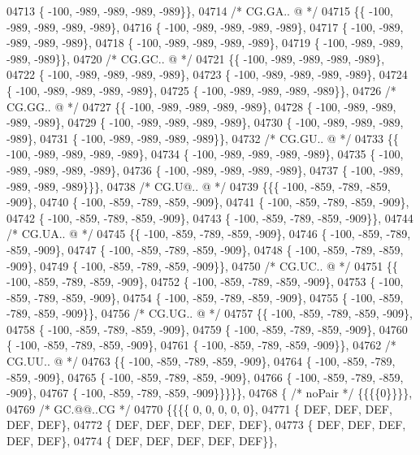 \begin{DoxyCode}
04713 \{ -100, -989, -989, -989, -989\}\},
04714 \textcolor{comment}{/* CG.GA.. @ */}
04715 \{\{ -100, -989, -989, -989, -989\},
04716 \{ -100, -989, -989, -989, -989\},
04717 \{ -100, -989, -989, -989, -989\},
04718 \{ -100, -989, -989, -989, -989\},
04719 \{ -100, -989, -989, -989, -989\}\},
04720 \textcolor{comment}{/* CG.GC.. @ */}
04721 \{\{ -100, -989, -989, -989, -989\},
04722 \{ -100, -989, -989, -989, -989\},
04723 \{ -100, -989, -989, -989, -989\},
04724 \{ -100, -989, -989, -989, -989\},
04725 \{ -100, -989, -989, -989, -989\}\},
04726 \textcolor{comment}{/* CG.GG.. @ */}
04727 \{\{ -100, -989, -989, -989, -989\},
04728 \{ -100, -989, -989, -989, -989\},
04729 \{ -100, -989, -989, -989, -989\},
04730 \{ -100, -989, -989, -989, -989\},
04731 \{ -100, -989, -989, -989, -989\}\},
04732 \textcolor{comment}{/* CG.GU.. @ */}
04733 \{\{ -100, -989, -989, -989, -989\},
04734 \{ -100, -989, -989, -989, -989\},
04735 \{ -100, -989, -989, -989, -989\},
04736 \{ -100, -989, -989, -989, -989\},
04737 \{ -100, -989, -989, -989, -989\}\}\},
04738 \textcolor{comment}{/* CG.U@.. @ */}
04739 \{\{\{ -100, -859, -789, -859, -909\},
04740 \{ -100, -859, -789, -859, -909\},
04741 \{ -100, -859, -789, -859, -909\},
04742 \{ -100, -859, -789, -859, -909\},
04743 \{ -100, -859, -789, -859, -909\}\},
04744 \textcolor{comment}{/* CG.UA.. @ */}
04745 \{\{ -100, -859, -789, -859, -909\},
04746 \{ -100, -859, -789, -859, -909\},
04747 \{ -100, -859, -789, -859, -909\},
04748 \{ -100, -859, -789, -859, -909\},
04749 \{ -100, -859, -789, -859, -909\}\},
04750 \textcolor{comment}{/* CG.UC.. @ */}
04751 \{\{ -100, -859, -789, -859, -909\},
04752 \{ -100, -859, -789, -859, -909\},
04753 \{ -100, -859, -789, -859, -909\},
04754 \{ -100, -859, -789, -859, -909\},
04755 \{ -100, -859, -789, -859, -909\}\},
04756 \textcolor{comment}{/* CG.UG.. @ */}
04757 \{\{ -100, -859, -789, -859, -909\},
04758 \{ -100, -859, -789, -859, -909\},
04759 \{ -100, -859, -789, -859, -909\},
04760 \{ -100, -859, -789, -859, -909\},
04761 \{ -100, -859, -789, -859, -909\}\},
04762 \textcolor{comment}{/* CG.UU.. @ */}
04763 \{\{ -100, -859, -789, -859, -909\},
04764 \{ -100, -859, -789, -859, -909\},
04765 \{ -100, -859, -789, -859, -909\},
04766 \{ -100, -859, -789, -859, -909\},
04767 \{ -100, -859, -789, -859, -909\}\}\}\}\},
04768 \{ \textcolor{comment}{/* noPair */} \{\{\{\{0\}\}\}\},
04769 \textcolor{comment}{/* GC.@@..CG */}
04770 \{\{\{\{    0,    0,    0,    0,    0\},
04771 \{  DEF,  DEF,  DEF,  DEF,  DEF\},
04772 \{  DEF,  DEF,  DEF,  DEF,  DEF\},
04773 \{  DEF,  DEF,  DEF,  DEF,  DEF\},
04774 \{  DEF,  DEF,  DEF,  DEF,  DEF\}\},

\end{DoxyCode}

